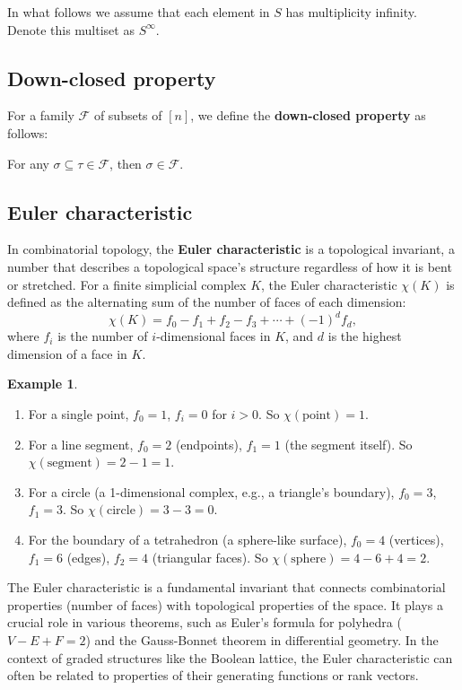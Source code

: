 \documentclass[12pt]{article}
\theoremstyle{definition}  %
\newtheorem{ex}[thm]{Example}
\numberwithin{equation}{subsection}
\begin{document}
In what follows we assume that each element in $S$ has multiplicity infinity. Denote this multiset as $S^{\infty}$.

\subsection{Down-closed property}
For a family $\mathcal{F}$ of subsets of $[n]$, we define the \textbf{down-closed property} as follows:
\begin{center}
    For any $\sigma \subseteq \tau \in \mathcal{F}$, then $\sigma \in \mathcal{F}$.
\end{center}

\subsection{Euler characteristic}
In combinatorial topology, the \textbf{Euler characteristic} is a topological invariant, a number that describes a topological space's structure regardless of how it is bent or stretched. For a finite simplicial complex $K$, the Euler characteristic $\chi(K)$ is defined as the alternating sum of the number of faces of each dimension:
\[
\chi(K) = f_0 - f_1 + f_2 - f_3 + \cdots + (-1)^d f_d,
\]
where $f_i$ is the number of $i$-dimensional faces in $K$, and $d$ is the highest dimension of a face in $K$.

\begin{ex}
\begin{enumerate}
    \item For a single point, $f_0 = 1$, $f_i = 0$ for $i > 0$. So $\chi(\text{point}) = 1$.
    \item For a line segment, $f_0 = 2$ (endpoints), $f_1 = 1$ (the segment itself). So $\chi(\text{segment}) = 2 - 1 = 1$.
    \item For a circle (a 1-dimensional complex, e.g., a triangle's boundary), $f_0 = 3$, $f_1 = 3$. So $\chi(\text{circle}) = 3 - 3 = 0$.
    \item For the boundary of a tetrahedron (a sphere-like surface), $f_0 = 4$ (vertices), $f_1 = 6$ (edges), $f_2 = 4$ (triangular faces). So $\chi(\text{sphere}) = 4 - 6 + 4 = 2$.
\end{enumerate}
\end{ex}

The Euler characteristic is a fundamental invariant that connects combinatorial properties (number of faces) with topological properties of the space. It plays a crucial role in various theorems, such as Euler's formula for polyhedra ($V-E+F=2$) and the Gauss-Bonnet theorem in differential geometry. In the context of graded structures like the Boolean lattice, the Euler characteristic can often be related to properties of their generating functions or rank vectors.
\end{document}
